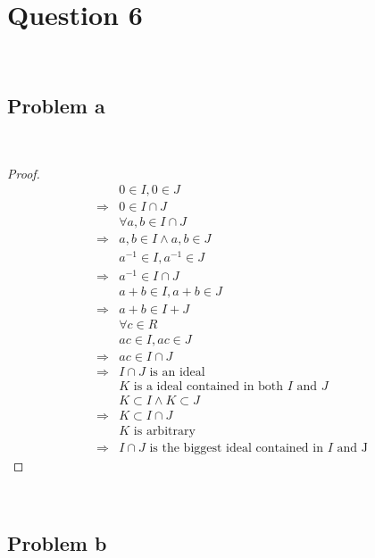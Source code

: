 \documentclass{article}
\begin{document}
\newpage

\section*{Question 6}

~

\subsection*{Problem a }

~

\begin{proof}
    \begin{align*}
        &0\in I,0\in J\\
        \Rightarrow&0\in I\cap J\\
        &\forall a,b\in I\cap J\\
        \Rightarrow&a,b\in I\land a,b \in J\\
        &a^{-1}\in I,a^{-1}\in J\\
        \Rightarrow&a^{-1}\in I\cap J\\
        &a+b\in I,a+b\in J\\
        \Rightarrow&a+b\in I+J\\
        &\forall c\in R\\
        &ac\in I,ac\in J\\
        \Rightarrow&ac\in I\cap J\\
        \Rightarrow&I\cap J\text{ is an ideal}\\
        &K\text{ is a ideal contained in both }I\text{ and }J\\
        &K\subset I\land K\subset J\\
        \Rightarrow& K \subset I\cap J\\
        &K\text{ is arbitrary}\\
        \Rightarrow&I\cap J\text{ is the biggest ideal contained in }I\text{ and J}
    \end{align*}
\end{proof}

~

\subsection*{Problem b}

~
\end{document}

